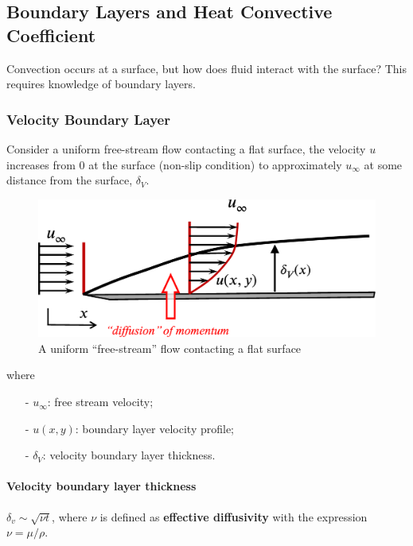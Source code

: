 \documentclass[12pt, a4paper]{article}
\begin{document}
\subsection{Boundary Layers and Heat Convective Coefficient}
Convection occurs at a surface, but how does fluid interact with the surface? This requires knowledge of boundary layers.

\subsubsection{Velocity Boundary Layer} 
Consider a uniform free-stream flow contacting a flat surface, the velocity $u$ increases from 0 at the surface (non-slip condition) to approximately $u_{\infty}$ at some distance from the surface, $\delta_{V}$.
\begin{figure}[H]
    \centering
    \includegraphics[width=.7\textwidth]{img/velocity_boundary_layer.eps}
    \caption{A uniform “free-stream” flow contacting a flat surface}
    \label{fig:velocity_BL}
\end{figure}
where 
\begin{itemize}
    \item[-] $u_\infty$: free stream velocity;
    \item[-] $u(x, y)$: boundary layer velocity profile;
    \item[-] $\delta_V$: velocity boundary layer thickness.
\end{itemize}

\paragraph{Velocity boundary layer thickness}  $\delta_{v} \sim \sqrt{\nu t}$, where $\nu$ is defined as \textbf{effective diffusivity} with the expression $\nu = \mu/\rho$.
\end{document}
